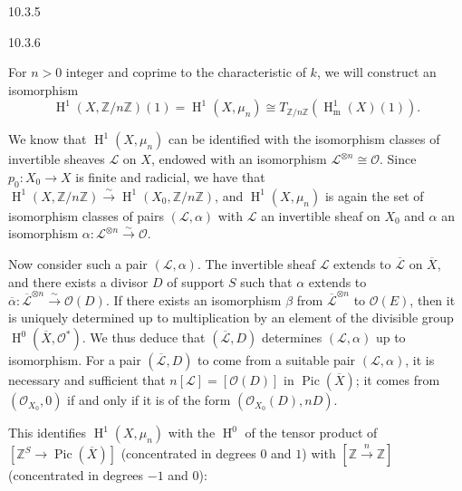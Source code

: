 \begin{remarks}{10.3.5}
\begin{enumerate}
  \end{enumerate}\end{remarks}\begin{construction}{10.3.6}\label{hodge-theory-iii-10.3.6}\skipsinglepar\par{}For \(n>0\) integer and coprime to the characteristic of \(k\), we will construct an isomorphism
    \[       \operatorname {H}^1(X,\mathbb {Z}{/}n\mathbb {Z})(1)       = \operatorname {H}^1(X,\mu _n)       \cong  T_{\mathbb {Z}{/}n\mathbb {Z}}(\operatorname {H}_\mathrm {m}^1(X)(1)).     \]\par{}We know that \(\operatorname {H}^1(X,\mu _n)\) can be identified with the isomorphism classes of invertible sheaves \(\mathscr {L}\) on \(X\), endowed with an isomorphism \(\mathscr {L}^{\otimes  n}\cong \mathcal {O}\).
    Since \(p_0\colon  X_0\to  X\) is finite and radicial, we have that \(\operatorname {H}^1(X,\mathbb {Z}{/}n\mathbb {Z})\xrightarrow {\sim }\operatorname {H}^1(X_0,\mathbb {Z}{/}n\mathbb {Z})\), and \(\operatorname {H}^1(X,\mu _n)\) is again the set of isomorphism classes of pairs \((\mathscr {L},\alpha )\) with \(\mathscr {L}\) an invertible sheaf on \(X_0\) and \(\alpha \) an isomorphism \(\alpha \colon \mathscr {L}^{\otimes {n}}\xrightarrow {\sim }\mathcal {O}\).\par{}Now consider such a pair \((\mathscr {L},\alpha )\).
    The invertible sheaf \(\mathscr {L}\) extends to \(\overline {\mathscr {L}}\) on \(\overline {X}\), and there exists a divisor \(D\) of support \(S\) such that \(\alpha \) extends to \(\overline {\alpha }\colon \overline {\mathscr {L}}^{\otimes  n}\xrightarrow {\sim }\mathcal {O}(D)\).
    If there exists an isomorphism \(\beta \) from \(\overline {\mathscr {L}}^{\otimes  n}\) to \(\mathcal {O}(E)\), then it is uniquely determined up to multiplication by an element of the divisible group \(\operatorname {H}^0(\overline {X},\mathcal {O}^*)\).
    We thus deduce that \((\overline {\mathscr {L}},D)\) determines \((\mathscr {L},\alpha )\) up to isomorphism.
    For a pair \((\overline {\mathscr {L}},D)\) to come from a suitable pair \((\mathscr {L},\alpha )\), it is necessary and sufficient that \(n[\mathscr {L}]=[\mathcal {O}(D)]\) in \(\operatorname {Pic}(\overline {X})\); it comes from \((\mathcal {O}_{X_0},0)\) if and only if it is of the form \((\mathcal {O}_{X_0}(D),nD)\).\par{}This identifies \(\operatorname {H}^1(X,\mu _n)\) with the \(\operatorname {H}^0\) of the tensor product of \([\mathbb {Z}^S\to \operatorname {Pic}(\overline {X})]\) (concentrated in degrees \(0\) and \(1\)) with \([\mathbb {Z}\xrightarrow {n}\mathbb {Z}]\) (concentrated in degrees \(-1\) and \(0\)):

\end{construction}
